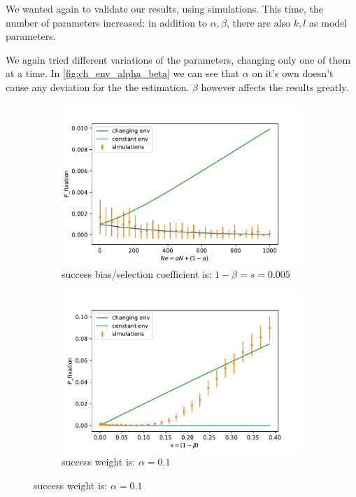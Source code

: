 \documentclass[11pt]{article}
\begin{document}
We wanted again to validate our results, using simulations.
This time, the number of parameters increased: in addition to $\alpha,\beta$, there are also $k,l$ as model parameters.

We again tried different variations of the parameters, changing only one of them at a time.
In \cref{fig:ch_env_alpha_beta} we can see that $\alpha$ on it's own doesn't cause any deviation for the the estimation. $\beta$ however affects the results greatly.

\begin{figure}[t]
  \begin{center}
  \begin{subfigure}[a]{0.49\linewidth}
  \caption{success bias/selection coefficient is: $1-\beta=s=0.005$}
    \includegraphics[width=\linewidth]{../figures/changed_env/ch_env_var_alpha.pdf}
   \end{subfigure}
   \begin{subfigure}[a]{0.49\linewidth}
   \caption{success weight is: $\alpha=0.1$}
    \includegraphics[width=\linewidth]{../figures/changed_env/ch_env_var_beta.pdf}

\end{subfigure}
\end{center}
\end{figure}
\end{document}
